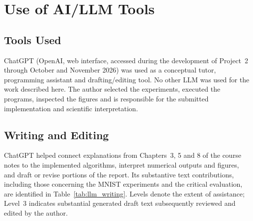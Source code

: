 \documentclass[aps,rmp,reprint,amsmath,amssymb,graphicx,longbibliography]{revtex4-1}
\begin{document}
\section{Use of AI/LLM Tools}

\subsection{Tools Used}

ChatGPT (OpenAI, web interface, accessed during the development of
Project~2 through October and November 2026) was used as a conceptual tutor,
programming assistant and drafting/editing tool. No other LLM was used
for the work described here. The author selected the experiments,
executed the programs, inspected the figures and is responsible for the
submitted implementation and scientific interpretation.

\subsection{Writing and Editing}

ChatGPT helped connect explanations from Chapters~3, 5 and 8 of the
course notes \cite{Book_Ch3, Book_Ch5, Book_Ch8} to the implemented algorithms, interpret numerical outputs
and figures, and draft or revise portions of the report. Its substantive
text contributions, including those concerning the MNIST experiments and
the critical evaluation, are identified in Table~\ref{tab:llm_writing}.
Levels denote the extent of assistance; Level~3 indicates substantial
generated draft text subsequently reviewed and edited by the author.
\end{document}
